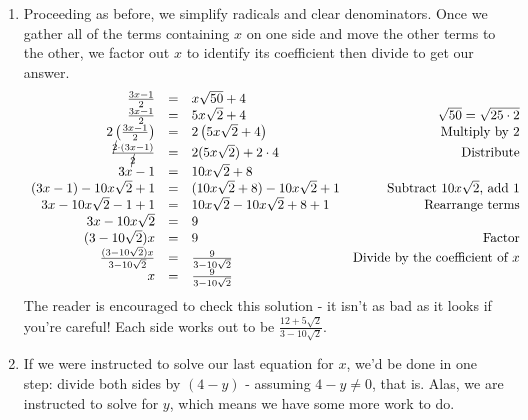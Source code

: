 \documentclass{ximera}
\begin{document}
\begin{example}
\begin{enumerate}
\item  Proceeding as before, we simplify radicals and clear denominators.  Once we gather all of the terms containing $x$ on one side and move the other terms to the other, we factor out $x$ to identify its coefficient then divide to get our answer.\[ \begin{array}{rclr}

 \frac{3x-1}{2} & = &  x\sqrt{50} + 4 & \\  

 \frac{3x-1}{2} & = &  5x\sqrt{2} + 4 & \text{$\sqrt{50} = \sqrt{25 \cdot 2}$} \\  

2\left( \frac{3x-1}{2}\right) & = & 2 \left(5x\sqrt{2} + 4 \right) & \text{Multiply by $2$} \\  

 \frac{\cancel{2} \cdot (3x-1)}{\cancel{2}} & = & 2 (5x \sqrt{2}) + 2\cdot 4 & \text{Distribute} \\  

3x - 1 & = & 10x \sqrt{2} + 8 & \\

(3x-1) - 10x\sqrt{2} + 1 & = & (10x \sqrt{2} + 8) - 10x\sqrt{2} + 1 & \text{Subtract $10x\sqrt{2}$,  add $1$} \\

3x - 10x\sqrt{2} - 1 + 1 & = & 10x\sqrt{2} - 10x\sqrt{2} + 8 + 1 & \text{Rearrange terms} \\

3x - 10x\sqrt{2} & = & 9 & \\

(3 - 10\sqrt{2}) x & = & 9 & \text{Factor} \\ 

 \frac{(3 - 10\sqrt{2}) x}{3 - 10\sqrt{2}} & = &  \frac{9}{3 - 10\sqrt{2}} & \text{Divide by the coefficient of $x$} \\  

x & = &  \frac{9}{3 - 10\sqrt{2}} & \\ \end{array} \] The reader is encouraged to check this solution - it isn't as bad as it looks if you're careful! Each side works out to be $ \frac{12 + 5\sqrt{2}}{3-10\sqrt{2}}$.

\item  If we were instructed to solve our last equation for $x$, we'd be done in one step: divide both sides by $(4-y)$ - assuming $4-y \neq 0$, that is.  Alas, we are instructed to solve for $y$, which means we have some more work to do.\[ \begin{array}{rclr}


\end{array}\]
\end{enumerate}
\end{example}
\end{document}
